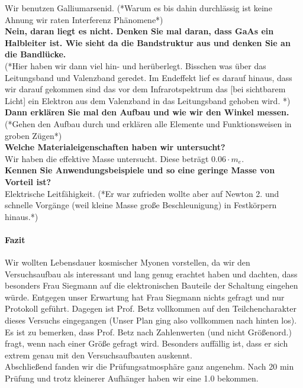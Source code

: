 Wir benutzen Galliumarsenid. (*Warum es bis dahin durchlässig ist keine Ahnung wir raten 
Interferenz Phänomene*) \\ 
\textbf{Nein, daran liegt es nicht. Denken Sie mal daran, dass GaAs ein Halbleiter ist. Wie sieht 
da die Bandstruktur aus und denken Sie an die Bandlücke.}\\
(*Hier haben wir dann viel hin- und herüberlegt. Bisschen was über das Leitungsband und Valenzband 
geredet. Im Endeffekt lief es darauf hinaus, dass wir darauf gekommen sind das vor dem 
Infrarotspektrum das [bei sichtbarem Licht] ein Elektron aus dem Valenzband in das Leitungsband gehoben wird. *) \\
\textbf{Dann erklären Sie mal den Aufbau und wie wir den Winkel messen.} \\
(*Gehen den Aufbau durch und erklären alle Elemente und Funktionsweisen in groben Zügen*) \\
\textbf{Welche Materialeigenschaften haben wir untersucht?} \\
Wir haben die effektive Masse untersucht. Diese beträgt $0.06\cdot m_e$. \\
\textbf{Kennen Sie Anwendungsbeispiele und so eine geringe Masse von Vorteil ist?} \\
Elektrische Leitfähigkeit. (*Er war zufrieden wollte aber auf Newton 2. und schnelle Vorgänge 
(weil kleine Masse große Beschleunigung) in Festkörpern hinaus.*) \\ 

\paragraph{Fazit}
Wir wollten Lebensdauer kosmischer Myonen vorstellen, da  wir den Versuchsaufbau als interessant und 
lang genug erachtet haben und dachten, dass besonders Frau Siegmann auf die elektronischen 
Bauteile der Schaltung eingehen würde. Entgegen unser Erwartung hat Frau Siegmann nichts gefragt 
und nur Protokoll geführt. Dagegen ist Prof. Betz vollkommen auf den Teilchencharakter dieses 
Versuchs eingegangen (Unser Plan ging also vollkommen nach hinten los). 
Es ist zu bemerken, dass Prof. Betz nach Zahlenwerten (und nicht Größenord.) fragt, wenn nach einer 
Größe gefragt wird. Besonders auffällig ist, dass er sich extrem genau mit den Versuchsaufbauten 
auskennt. \\ 
Abschließend fanden wir die Prüfungsatmosphäre ganz angenehm. Nach 20 min Prüfung und trotz 
kleinerer Aufhänger haben wir eine 1.0 bekommen. 


